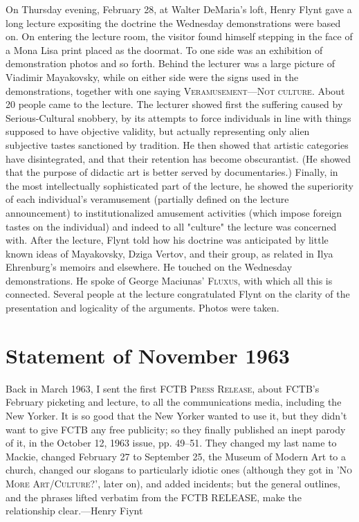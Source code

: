 \documentclass[10pt,twoside,draft]{memoir}
\begin{document}
{On Thursday evening, February 28, at Walter DeMaria's loft, Henry Flynt 
gave a long lecture expositing the doctrine the Wednesday demonstrations 
were based on. On entering the lecture room, the visitor found himself 
stepping in the face of a Mona Lisa print placed as the doormat. To one side 
was an exhibition of demonstration photos and so forth. Behind the lecturer 
was a large picture of Viadimir Mayakovsky, while on either side were the 
signs used in the demonstrations, together with one saying 
\textsc{Veramusement---Not culture}. About 20 people came to the lecture. 
The lecturer showed first the suffering caused by Serious-Cultural snobbery, 
by its attempts to force individuals in line with things supposed to have 
objective validity, but actually representing only alien subjective tastes 
sanctioned by tradition. He then showed that artistic categories have 
disintegrated, and that their retention has become obscurantist. (He showed 
that the purpose of didactic art is better served by documentaries.) Finally, 
in the most intellectually sophisticated part of the lecture, he showed the 
superiority of each individual's veramusement (partially defined on the 
lecture announcement) to institutionalized amusement activities (which 
impose foreign tastes on the individual) and indeed to all "culture" the 
lecture was concerned with. After the lecture, Flynt told how his doctrine 
was anticipated by little known ideas of Mayakovsky, Dziga Vertov, and 
their group, as related in Ilya Ehrenburg's memoirs and elsewhere. He 
touched on the Wednesday demonstrations. He spoke of George Maciunas' 
\textsc{Fluxus}, with which all this is connected. Several people at the lecture 
congratulated Flynt on the clarity of the presentation and logicality of the 
arguments. Photos were taken. 

\section{Statement of November 1963}


Back in March 1963, I sent the first \textsc{FCTB Press Release}, about FCTB's 
February picketing and lecture, to all the communications media, including 
the New Yorker. It is so good that the New Yorker wanted to use it, but 
they didn't want to give FCTB any free publicity; so they finally published 
an inept parody of it, in the October 12, 1963 issue, pp. 49--51. They 
changed my last name to Mackie, changed February 27 to September 25, the 
Museum of Modern Art to a church, changed our slogans to particularly 
idiotic ones (although they got in '\textsc{No More Art/Culture?}', later on), 
and added incidents; but the general outlines, and the phrases lifted verbatim 
from the FCTB RELEASE, make the relationship clear.---Henry Fiynt 

}
\end{document}
